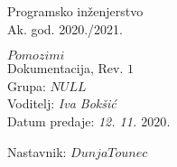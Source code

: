 \documentclass[12pt]{report}
\begin{document}
 
	
	
	
	\begin{titlepage}
		\begin{center}
			\LARGE Programsko inženjerstvo\\
			\large Ak. god. 2020./2021.\\
			
			
			\huge $ Pomozi $\space$ mi $\\
			\Large Dokumentacija, Rev. \textit{$1$}\\
			
			\normalsize
			Grupa: \textit{$NULL$}\\
			Voditelj: \textit{Iva \space Bokšić}\\
			
			
			Datum predaje: \textit{12. 11. $2020$.}\\
	
			
			Nastavnik: \textit{$Dunja $\space$ Tounec$}\\
		
		\end{center}

	
	\end{titlepage}

	
	\tableofcontents

	
	
	
	
	
	
	
	
	
	\begingroup
	\renewcommand*\listfigurename{Indeks slika i dijagrama}
	\listoffigures
	\endgroup

	
	\eject 
		
	
\end{document}
